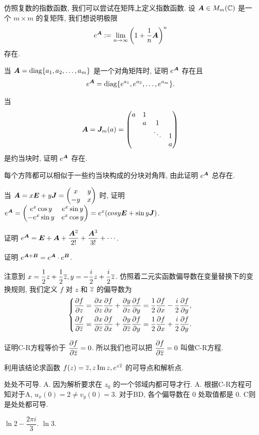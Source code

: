 \sectionExtraReading
\begin{homework}
	\item 仿照复数的指数函数, 我们可以尝试在矩阵上定义指数函数. 设 ${\boldsymbol{A}}\in M_m({\mathbb{C}})$ 是一个 $m\times m$ 的复矩阵, 我们想说明极限
	\[e^{\boldsymbol{A}}:=\lim_{n\to \infty}\left(1+\frac1n {\boldsymbol{A}}\right)^n\]
	存在.
	\begin{exlist}
		\item 当 ${\boldsymbol{A}}={\mathrm{diag}}{\left\{a_1,a_2,\dots,a_m\right\}}$ 是一个对角矩阵时, 证明 $e^{\boldsymbol{A}}$ 存在且
		\[e^{\boldsymbol{A}}={\mathrm{diag}}{\left\{e^{a_1},e^{a_2},\dots,e^{a_m}\right\}}.\]
		\item 当
		\[{\boldsymbol{A}}={\boldsymbol{J}}_m(a)=\begin{pmatrix}
			a&1&   &\\
			&a& 1 &\\
			& &\ddots&1\\
			& &      &a
		\end{pmatrix}\]
		是约当块时, 证明 $e^{\boldsymbol{A}}$ 存在.
		\item 每个方阵都可以相似于一些约当块构成的分块对角阵, 由此证明 $e^{\boldsymbol{A}}$ 总存在.
		\item 当 ${\boldsymbol{A}}=x{\boldsymbol{E}}+y{\boldsymbol{J}}=\begin{pmatrix}
			x&y\\-y&x
		\end{pmatrix}$ 时, 证明 $e^{\boldsymbol{A}}=\begin{pmatrix}
			e^x\cos y&e^x\sin y\\-e^x\sin y&e^x\cos y
		\end{pmatrix}=e^x(cos y{\boldsymbol{E}}+\sin y {\boldsymbol{J}})$.
		\item 证明 $e^{\boldsymbol{A}}={\boldsymbol{E}}+{\boldsymbol{A}}+\dfrac{{\boldsymbol{A}}^2}{2!}+\dfrac{{\boldsymbol{A}}^3}{3!}+\cdots$.
		\item 证明 $e^{{\boldsymbol{A}}+{\boldsymbol{B}}}=e^{\boldsymbol{A}}\cdot e^{\boldsymbol{B}}$.
	\end{exlist}
	
	\item 注意到 $x=\dfrac12z+\dfrac12\overline z,y=-\dfrac i2z+\dfrac i2\overline z$.
	仿照着二元实函数偏导数在变量替换下的变换规则, 我们定义 $f$ 对 $z$ 和 $\overline z$ 的偏导数为
	\[\left\{
	\begin{aligned}
		\frac{\partial f}{\partial z}&
	=\frac{\partial x}{\partial z}\frac{\partial f}{\partial x}
		+\frac{\partial y}{\partial z}\frac{\partial f}{\partial y}
	=\frac12\frac{\partial f}{\partial x}-\frac i2\frac{\partial f}{\partial y},\\
		\frac{\partial f}{\partial \overline z}&
	=\frac{\partial x}{\partial \overline z}\frac{\partial f}{\partial x}
		+\frac{\partial y}{\partial \overline z}\frac{\partial f}{\partial y}
	=\frac12\frac{\partial f}{\partial x}+\frac i2\frac{\partial f}{\partial y}.
	\end{aligned}\right.\]
	\begin{exlist}
	\item 证明C-R方程等价于 $\dfrac{\partial f}{\partial \overline z}
	=0$.
	所以我们也可以把 \emph{$\dfrac{\partial f}{\partial \overline z}=0$} 叫做C-R方程.

	\item 利用该结论求函数 $f(z)=\overline z, z\operatorname{Im} z, e^{z\overline z}$ 的可导点和解析点.
	\end{exlist}
\end{homework}



\sectionExerciseAnswer
\exans 处处不可导.
\exans A. 因为解析要求在 $z_0$ 的一个邻域内都可导才行.
\exans A. 根据C-R方程可知对于A, $u_x(0)=2\neq v_y(0)=3$. 对于BD, 各个偏导数在 $0$ 处取值都是 $0$. C则是处处都可导.

\exans $\ln 2-\dfrac{2\pi i}3$.
\exans $\ln 3$.



